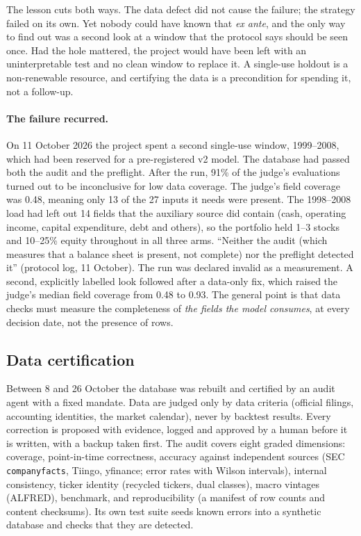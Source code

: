 \documentclass[11pt]{article}
\begin{document}
The lesson cuts both ways. The data defect did not cause the failure; the strategy failed on its own. Yet nobody could have known that \emph{ex ante}, and the only way to find out was a second look at a window that the protocol says should be seen once. Had the hole mattered, the project would have been left with an uninterpretable test and no clean window to replace it. A single-use holdout is a non-renewable resource, and certifying the data is a precondition for spending it, not a follow-up.

\paragraph{The failure recurred.} On 11 October 2026 the project spent a second single-use window, 1999--2008, which had been reserved for a pre-registered v2 model. The database had passed both the audit and the preflight. After the run, 91\% of the judge's evaluations turned out to be inconclusive for low data coverage. The judge's field coverage was 0.48, meaning only 13 of the 27 inputs it needs were present. The 1998--2008 load had left out 14 fields that the auxiliary source did contain (cash, operating income, capital expenditure, debt and others), so the portfolio held 1--3 stocks and 10--25\% equity throughout in all three arms. ``Neither the audit (which measures that a balance sheet is present, not complete) nor the preflight detected it'' (protocol log, 11 October). The run was declared invalid as a measurement. A second, explicitly labelled look followed after a data-only fix, which raised the judge's median field coverage from 0.48 to 0.93. The general point is that data checks must measure the completeness of \emph{the fields the model consumes}, at every decision date, not the presence of rows.

\subsection{Data certification}\label{sec:cert}

Between 8 and 26 October the database was rebuilt and certified by an audit agent with a fixed mandate. Data are judged only by data criteria (official filings, accounting identities, the market calendar), never by backtest results. Every correction is proposed with evidence, logged and approved by a human before it is written, with a backup taken first. The audit covers eight graded dimensions: coverage, point-in-time correctness, accuracy against independent sources (SEC \texttt{companyfacts}, Tiingo, yfinance; error rates with Wilson intervals), internal consistency, ticker identity (recycled tickers, dual classes), macro vintages (ALFRED), benchmark, and reproducibility (a manifest of row counts and content checksums). Its own test suite seeds known errors into a synthetic database and checks that they are detected.
\end{document}
